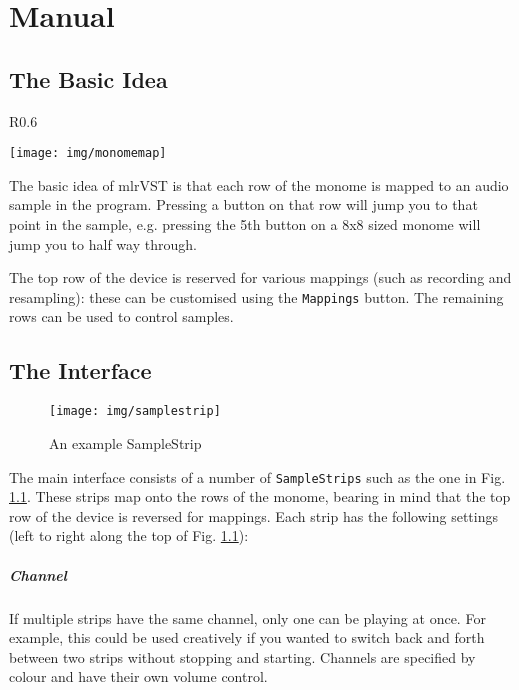 \documentclass[10pt,a4paper]{report}
\begin{document}
\chapter{Manual}\label{sec:manual}



\section{The Basic Idea}

\begin{wrapfigure}{R}{0.6\textwidth}

	\vspace{-13pt}
	\centering
	\texttt{[image: img/monomemap]}
	\caption{Schematic of basic operations}
	\label{fig:samplestrip}

\end{wrapfigure}
The basic idea of mlrVST is that each row of the monome is mapped to an audio sample in the program. Pressing a button on that row will jump you to that point in the sample, e.g. pressing the 5th button on a 8x8 sized monome will jump you to half way through.

The top row of the device is reserved for various mappings (such as recording and resampling): these can be customised using the \texttt{Mappings} button. The remaining rows can be used to control samples.





\section{The Interface}

\begin{figure}[h!]
	\hspace{-100pt}
	\texttt{[image: img/samplestrip]}
	\caption{An example SampleStrip}
	\label{fig:samplestrip}
\end{figure}

The main interface consists of a number of \texttt{SampleStrips} such as the one in Fig. \ref{fig:samplestrip}. These strips map onto the rows of the monome, bearing in mind that the top row of the device is reversed for mappings. Each strip has the following settings (left to right along the top of Fig. \ref{fig:samplestrip}):

\paragraph{Channel} If multiple strips have the same channel, only one can be playing at once. For example, this could be used creatively if you wanted to switch back and forth between two strips without stopping and starting. Channels are specified by colour and have their own volume control.
\end{document}
